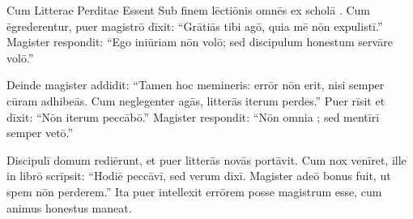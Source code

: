 \documentclass[12pt]{nextbook}
\begin{document}
\begin{readersection}{Cum Litterae Perditae Essent}
Sub finem lēctiōnis omnēs ex scholā . Cum ēgrederentur, puer magistrō dīxit: “Grātiās tibi agō, quia mē nōn expulistī.” Magister respondit: “Ego iniūriam  nōn volō; sed discipulum honestum servāre volō.”

Deinde magister addidit: “Tamen hoc memineris:  errōr nōn erit, nisi semper cūram adhibeās. Cum neglegenter agās, litterās iterum perdes.” Puer rīsit et dīxit: “Nōn iterum peccābō.” Magister respondit: “Nōn omnia ; sed mentīrī semper vetō.”

Discipulī domum rediērunt, et puer litterās novās portāvit. Cum nox venīret, ille in librō scrīpsit: “Hodiē peccāvī, sed verum dīxī. Magister adeō bonus fuit, ut spem nōn perderem.” Ita puer intellexit errōrem posse magistrum esse, cum animus honestus maneat.

\end{readersection}
\end{document}
